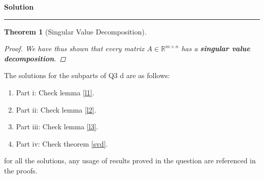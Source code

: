 \documentclass[a4paper,12pt]{article}
\newenvironment{solution}[2][]{%
    \begin{mdframed}[linecolor=blue!70!black, linewidth=2pt, roundcorner=10pt, backgroundcolor=yellow!10!white, skipabove=12pt, skipbelow=12pt]%
        \textbf{\large #2}
        \par\noindent\rule{\textwidth}{0.4pt}
}{
    \end{mdframed}
}
\newtheorem{theorem}{Theorem}
\begin{document}
\begin{solution}{Solution}
\begin{theorem}[Singular Value Decomposition]
\begin{proof}
              We have thus shown that every matrix $A \in \mathbb{R}^{m \times n}$ has a \textbf{singular value decomposition}.
            \end{proof}
        \end{theorem}
        The solutions for the subparts of Q3 d are as follows:
        \begin{enumerate}
          \item Part i: Check lemma \@\ref{l1}.
          \item Part ii: Check lemma \@\ref{l2}.
          \item Part iii: Check lemma \@\ref{l3}.
          \item Part iv: Check theorem \@\ref{svd}.
        \end{enumerate}
        for all the solutions, any usage of results proved in the question are referenced in the proofs.
  \end{solution}
\end{document}
